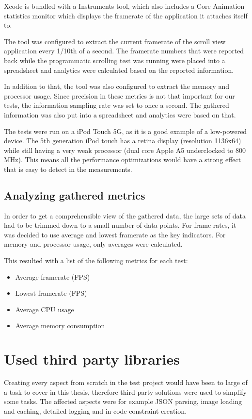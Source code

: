 \documentclass[a4paper,12pt]{article}
\begin{document}
Xcode is bundled with a Instruments tool, which also includes a Core Animation statistics monitor which displays the framerate of the application it attaches itself to.

The tool was configured to extract the current framerate of the scroll view application every 1/10th of a second. The framerate numbers that were reported back while the programmatic scrolling test was running were placed into a spreadsheet and analytics were calculated based on the reported information.

In addition to that, the tool was also configured to extract the memory and processor usage. Since precision in these metrics is not that important for our tests, the information sampling rate was set to once a second. The gathered information was also put into a spreadsheet and analytics were based on that.

The tests were run on a iPod Touch 5G, as it is a good example of a low-powered device. The 5th generation iPod touch has a retina display (resolution 1136x64)\cite{AppleIPodTouch5G} while still having a very weak processor (dual core Apple A5 underclocked to 800 MHz)\cite{MacObserverUnderclock}. This means all the performance optimizations would have a strong effect that is easy to detect in the measurements.

\subsection{Analyzing gathered metrics}
In order to get a comprehensible view of the gathered data, the large sets of data had to be trimmed down to a small number of data points. For frame rates, it was decided to use average and lowest framerate as the key indicators. For memory and processor usage, only averages were calculated.

This resulted with a list of the following metrics for each test:
\begin{itemize}
  \item Average framerate (FPS)
  \item Lowest framerate (FPS)
  \item Average CPU usage
  \item Average memory consumption
\end{itemize}

\newpage
\section{Used third party libraries}
Creating every aspect from scratch in the test project would have been to large of a task to cover in this thesis, therefore third-party solutions were used to simplify some tasks. The affected aspects were for example JSON parsing, image loading and caching, detailed logging and in-code constraint creation.
\end{document}
